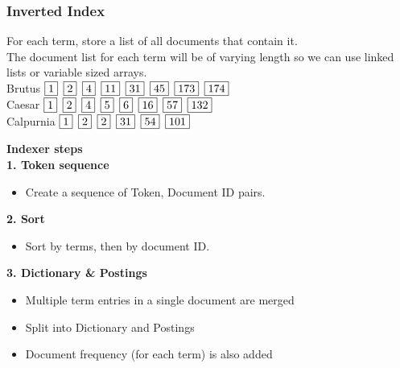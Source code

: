 \documentclass[11pt]{article}
\begin{document}
\subsubsection{Inverted Index}
For each term, store a list of all documents that contain it.\\
The document list for each term will be of varying length so we can use linked lists or variable sized arrays.\\
\newline
\newcommand{\sep}{\hspace*{.5em}}
  \noindent
  Brutus \textrightarrow \hspace{8.4mm}$\fbox{1} \sep \fbox{2} \sep \fbox{4} \sep \fbox{11} \sep \fbox{31} \sep \fbox{45} \sep \fbox{173} \sep \fbox{174}$\\ \newline
  Caesar \textrightarrow \hspace{8.4mm}$\fbox{1} \sep \fbox{2} \sep \fbox{4} \sep \fbox{5} \sep \fbox{6} \sep \fbox{16} \sep \fbox{57} \sep \fbox{132}$\\ \newline
  Calpurnia \textrightarrow \hspace{3mm}$\fbox{1} \sep \fbox{2} \sep \fbox{2} \sep \fbox{31} \sep \fbox{54} \sep \fbox{101}$

\newline
\textbf{Indexer steps}\\
\newline
\textbf{1. Token sequence}
\begin{itemize}
    \item Create a sequence of Token, Document ID pairs.
\end{itemize}
\textbf{2. Sort}
\begin{itemize}
    \item Sort by terms, then by document ID.
\end{itemize}
\textbf{3. Dictionary \& Postings}
\begin{itemize}
    \item Multiple term entries in a single document are merged
    \item Split into Dictionary and Postings
    \item Document frequency (for each term) is also added
\end{itemize}
\end{document}
